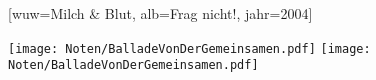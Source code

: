 [wuw={Milch \& Blut}, alb={Frag nicht!}, jahr={2004}]




\beginverse
\endverse
\texttt{[image: Noten/BalladeVonDerGemeinsamen.pdf]}
\texttt{[image: Noten/BalladeVonDerGemeinsamen.pdf]}

